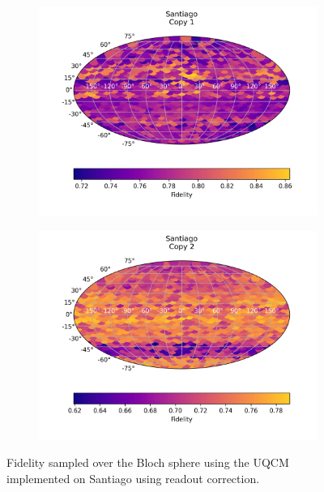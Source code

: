 \begin{figure}[H]
    \centering
    \begin{subfigure}{.5\textwidth}
      \centering
      \includegraphics[width=\textwidth]{Figures/UQCM/IBM/FullSphere/results_corrected_santiago_copy1.png}
    \end{subfigure}%
    \begin{subfigure}{.5\textwidth}
      \centering
      \includegraphics[width=\textwidth]{Figures/UQCM/IBM/FullSphere/results_corrected_santiago_copy2.png}
    \end{subfigure}
    \caption{Fidelity sampled over the Bloch sphere using the UQCM implemented on Santiago using readout correction.}
    \label{fig:uqcm_sant}
\end{figure}

